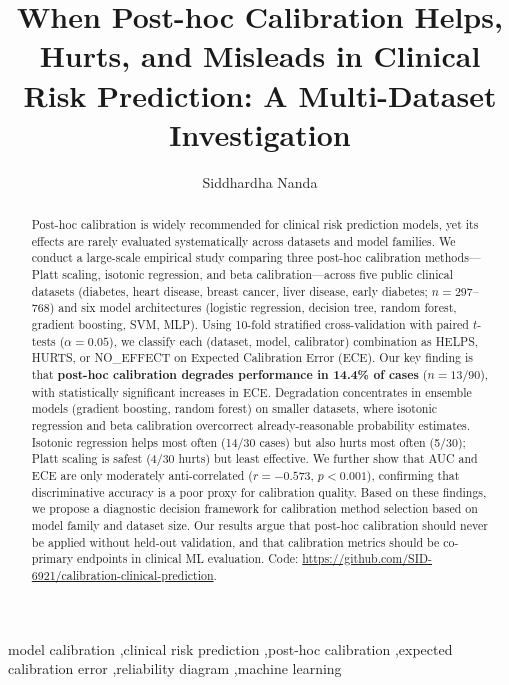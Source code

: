 \documentclass[preprint,12pt]{elsarticle}
\begin{document}
\begin{frontmatter}

\title{When Post-hoc Calibration Helps, Hurts, and Misleads in Clinical Risk Prediction: A Multi-Dataset Investigation}

\author{Siddhardha Nanda}
\address{Department of Biomedical Engineering, Columbia University, New York, NY, USA}

\begin{abstract}
Post-hoc calibration is widely recommended for clinical risk prediction models, yet its effects are rarely evaluated systematically across datasets and model families. We conduct a large-scale empirical study comparing three post-hoc calibration methods---Platt scaling, isotonic regression, and beta calibration---across five public clinical datasets (diabetes, heart disease, breast cancer, liver disease, early diabetes; $n=297$--$768$) and six model architectures (logistic regression, decision tree, random forest, gradient boosting, SVM, MLP). Using 10-fold stratified cross-validation with paired $t$-tests ($\alpha=0.05$), we classify each (dataset, model, calibrator) combination as HELPS, HURTS, or NO\_EFFECT on Expected Calibration Error (ECE). Our key finding is that \textbf{post-hoc calibration degrades performance in 14.4\% of cases} ($n=13/90$), with statistically significant increases in ECE. Degradation concentrates in ensemble models (gradient boosting, random forest) on smaller datasets, where isotonic regression and beta calibration overcorrect already-reasonable probability estimates. Isotonic regression helps most often (14/30 cases) but also hurts most often (5/30); Platt scaling is safest (4/30 hurts) but least effective. We further show that AUC and ECE are only moderately anti-correlated ($r=-0.573$, $p<0.001$), confirming that discriminative accuracy is a poor proxy for calibration quality. Based on these findings, we propose a diagnostic decision framework for calibration method selection based on model family and dataset size. Our results argue that post-hoc calibration should never be applied without held-out validation, and that calibration metrics should be co-primary endpoints in clinical ML evaluation. Code: \url{https://github.com/SID-6921/calibration-clinical-prediction}.
\end{abstract}

\begin{keyword}
model calibration \sep clinical risk prediction \sep post-hoc calibration \sep expected calibration error \sep reliability diagram \sep machine learning
\end{keyword}

\end{frontmatter}
\end{document}
